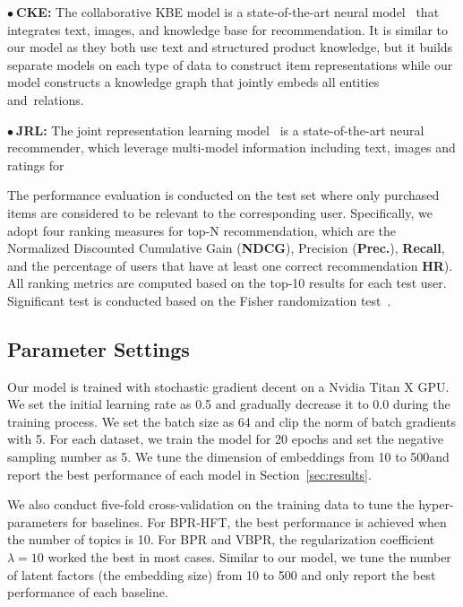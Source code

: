 \documentclass[algorithms,article,accept,moreauthors,pdftex,10pt,a4paper]{Definitions/mdpi}
\begin{document}
$\bullet~$\textbf{CKE: } The collaborative KBE model is a state-of-the-art neural model~\cite{zhang2016collaborativekdd} that integrates text, images, and knowledge base for recommendation. It is similar to our model as they both use text and structured product knowledge, but it builds separate models on each type of data to construct item representations while our model constructs a knowledge graph that jointly embeds all entities and~relations. 

$\bullet~$\textbf{JRL: } The joint representation learning model~\cite{zhang2017joint} is a state-of-the-art neural recommender, which leverage multi-model information including text, images and ratings for 

\vspace{6 pt} The performance evaluation is conducted on the test set where only purchased items are considered to be relevant to the corresponding user.
Specifically, we adopt four ranking measures for top-N recommendation, which are the Normalized Discounted Cumulative Gain (\textbf{NDCG}), Precision (\textbf{Prec.}), \textbf{Recall}, and the percentage of users that have at least one correct recommendation \textbf{HR}).
All ranking metrics are computed based on the top-10 results for each test user.
Significant test is conducted based on the Fisher randomization test~\cite{smucker2007comparison}.




\subsection{Parameter Settings}

Our model is trained with stochastic gradient decent on a Nvidia Titan X GPU.
We set the initial learning rate as 0.5 and gradually decrease it to 0.0 during the training process. 
We set the batch size as 64 and clip the norm of batch gradients with 5.
For each dataset, we train the model for 20 epochs and set the negative sampling number as 5.
We tune the dimension of embeddings from 10 to 500\linebreak{ ([10, 50, 100, 200, 300, 400, 500]) }and report the best performance of each model in Section~\ref{sec:results}.

We also conduct five-fold cross-validation on the training data to tune the hyper-parameters for baselines. 
For BPR-HFT, the best performance is achieved when the number of topics is 10.
For BPR and VBPR, the regularization coefficient $\lambda =10$ worked the best in most cases.
Similar to our model, we tune the number of latent factors (the embedding size) from 10 to 500 and only report the best performance of each baseline.
\end{document}

